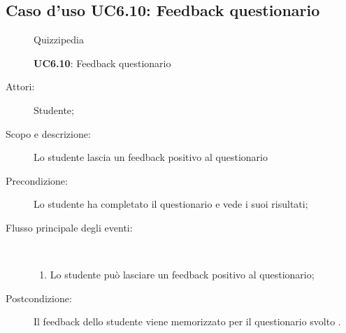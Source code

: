 \subsection{Caso d'uso UC6.10: Feedback questionario}
	\begin{figure}[H]
		\centering
		\begin{resizedtikzpicture}{\textwidth}
		\begin{umlsystem}[x=0, fill=lightgray!20]{Quizzipedia}
		\end{umlsystem}
		\end{resizedtikzpicture}
		\caption{\textbf{UC6.10}: Feedback questionario}
		\label{UC6.10}
	\end{figure}
\begin{description}
\item[Attori:] Studente;
\item[Scopo e descrizione:] Lo studente lascia un feedback positivo al questionario
      \item[Precondizione:] Lo studente ha completato il questionario e vede i suoi risultati;

        \item[Flusso principale degli eventi:] \ 
 \begin{enumerate}
          \item Lo studente può lasciare un feedback positivo al questionario;

      \end{enumerate}
    \item[Postcondizione:] Il feedback dello studente viene memorizzato per il questionario svolto .
  \end{description}
\hypertarget{UC6.11}{}
